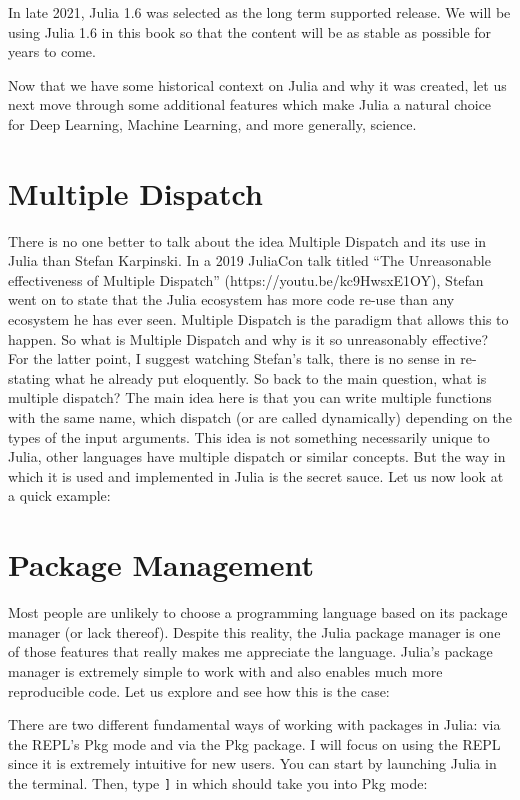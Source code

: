 \documentclass[
  notoc %
]{tufte-book}
\newcommand{\passthrough}[1]{#1}
\begin{document}
In late 2021, Julia 1.6 was selected as the long term supported release.
We will be using Julia 1.6 in this book so that the content will be as
stable as possible for years to come.

Now that we have some historical context on Julia and why it was
created, let us next move through some additional features which make
Julia a natural choice for Deep Learning, Machine Learning, and more
generally, science.

\hypertarget{sec:dispatch}{%
\section{Multiple Dispatch}\label{sec:dispatch}}

There is no one better to talk about the idea Multiple Dispatch and its
use in Julia than Stefan Karpinski. In a 2019 JuliaCon talk titled ``The
Unreasonable effectiveness of Multiple Dispatch''
(https://youtu.be/kc9HwsxE1OY), Stefan went on to state that the Julia
ecosystem has more code re-use than any ecosystem he has ever seen.
Multiple Dispatch is the paradigm that allows this to happen. So what is
Multiple Dispatch and why is it so unreasonably effective? For the
latter point, I suggest watching Stefan's talk, there is no sense in
re-stating what he already put eloquently. So back to the main question,
what is multiple dispatch? The main idea here is that you can write
multiple functions with the same name, which dispatch (or are called
dynamically) depending on the types of the input arguments. This idea is
not something necessarily unique to Julia, other languages have multiple
dispatch or similar concepts. But the way in which it is used and
implemented in Julia is the secret sauce. Let us now look at a quick
example:

\hypertarget{sec:packages}{%
\section{Package Management}\label{sec:packages}}

Most people are unlikely to choose a programming language based on its
package manager (or lack thereof). Despite this reality, the Julia
package manager is one of those features that really makes me appreciate
the language. Julia's package manager is extremely simple to work with
and also enables much more reproducible code. Let us explore and see how
this is the case:

There are two different fundamental ways of working with packages in
Julia: via the REPL's Pkg mode and via the Pkg package. I will focus on
using the REPL since it is extremely intuitive for new users. You can
start by launching Julia in the terminal. Then, type
\passthrough{\lstinline!]!} in which should take you into Pkg mode:
\end{document}
